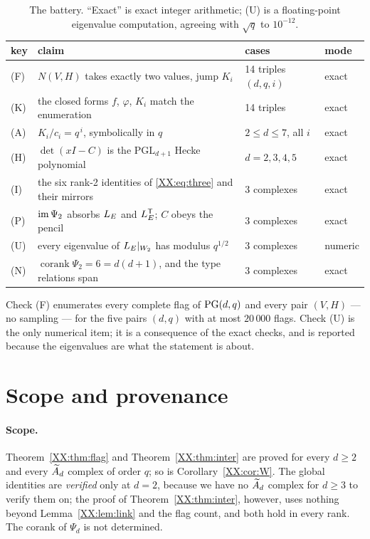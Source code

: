 \begin{table}[h]
\centering
\begin{tabular}{llll}
\toprule
key & claim & cases & mode\\
\midrule
(F) & $N(V,H)$ takes exactly two values, jump $K_i$ & 14 triples $(d,q,i)$ & exact\\
(K) & the closed forms $f$, $\varphi$, $K_i$ match the enumeration & 14 triples & exact\\
(A) & $K_i/c_i=q^{\,i}$, symbolically in $q$ & $2\le d\le7$, all $i$ & exact\\
(H) & $\det(xI-C)$ is the $\mathrm{PGL}_{d+1}$ Hecke polynomial & $d=2,3,4,5$ & exact\\
(I) & the six rank-2 identities of \eqref{XX:eq:three} and their mirrors & 3 complexes & exact\\
(P) & $\operatorname{im}\Psi_2$ absorbs $L_E$ and $L_E^{\mathsf{T}}$; $C$ obeys the pencil & 3 complexes & exact\\
(U) & every eigenvalue of $L_E|_{W_2}$ has modulus $q^{1/2}$ & 3 complexes & numeric\\
(N) & $\operatorname{corank}\Psi_2=6=d(d+1)$, and the type relations span & 3 complexes & exact\\
\bottomrule
\end{tabular}
\caption{The battery. ``Exact'' is exact integer arithmetic; (U) is a floating-point
eigenvalue computation, agreeing with $\sqrt q$ to $10^{-12}$.}
\label{XX:tab:battery}
\end{table}

Check (F) enumerates every complete flag of $\mathrm{PG}(d,q)$ and every pair $(V,H)$ --- no sampling
--- for the five pairs $(d,q)$ with at most $20\,000$ flags. Check (U) is the only numerical
item; it is a consequence of the exact checks, and is reported because the eigenvalues are
what the statement is about.

\section{Scope and provenance}

\paragraph{Scope.} Theorem~\ref{XX:thm:flag} and Theorem~\ref{XX:thm:inter} are proved for every
$d\ge2$ and every $\widetilde A_{d}$ complex of order $q$; so is Corollary~\ref{XX:cor:W}. The global
identities are \emph{verified} only at $d=2$, because we have no $\widetilde A_{d}$ complex for
$d\ge3$ to verify them on; the proof of Theorem~\ref{XX:thm:inter}, however, uses nothing beyond
Lemma~\ref{XX:lem:link} and the flag count, and both hold in every rank. The corank of $\Psi_d$
is not determined.

